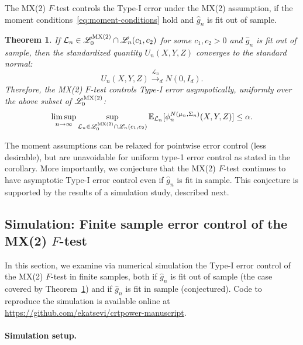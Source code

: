 \documentclass[12pt]{article}
\newtheorem{theorem}{Theorem}
\theoremstyle{definition}
\theoremstyle{remark}
\newcommand{\srx}{X}
\newcommand{\srz}{Z}
\newcommand{\sry}{Y}
\begin{document}
The MX(2) $F$-test controls the Type-I error under the MX(2) assumption, if the moment conditions~\eqref{eq:moment-conditions} hold and $\widehat g_n$ is fit out of sample.
\begin{theorem} \label{thm:asymptotic-alpha-level}
If $\mathcal L_n \in \mathscr L_0^{\textnormal{MX(2)}}\cap \mathscr L_n(c_1, c_2)$ for some $c_1, c_2 > 0$ and $\widehat g_n$ is fit out of sample, then the standardized quantity $U_n(\srx, \sry, \srz)$ converges to the standard normal: 
\begin{equation}
	U_n(\srx, \sry, \srz) \overset{\mathcal L_n}\rightarrow_d N(0, I_d).
	\label{eq:asymptotic-normality}
\end{equation}
Therefore, the MX(2) $F$-test controls Type-I error asympotically, uniformly over the above subset of $\mathscr L_0^{\textnormal{MX(2)}}$: 
\begin{equation}
	\limsup_{n \rightarrow \infty} \sup_{\mathcal L_n \in \mathscr L_0^{\textnormal{MX(2)}}\cap \mathscr L_n(c_1, c_2)} \mathbb E_{\mathcal L_n}[\phi^{N(\mu_n, \Sigma_n)}_n(\srx, \sry, \srz)] \leq \alpha.
	\label{asymptotic-alpha-level}
\end{equation}
\end{theorem}

The moment assumptions can be relaxed for pointwise error control (less desirable), but are unavoidable for uniform type-1 error control as stated in the corollary. More importantly, we conjecture that the MX(2) $F$-test continues to have asymptotic Type-I error control even if $\widehat g_n$ is fit in sample. This conjecture is supported by the results of a simulation study, described next.

\subsection{Simulation: Finite sample error control of the MX(2) $F$-test}  \label{sec:simulations}

In this section, we examine via numerical simulation the Type-I error control of the MX(2) $F$-test in finite samples, both if $\widehat g_n$ is fit out of sample (the case covered by Theorem~\ref{thm:asymptotic-alpha-level}) and if $\widehat g_n$ is fit in sample (conjectured). Code to reproduce the simulation is available online at \url{https://github.com/ekatsevi/crtpower-manuscript}.

\paragraph{Simulation setup.}
\end{document}
